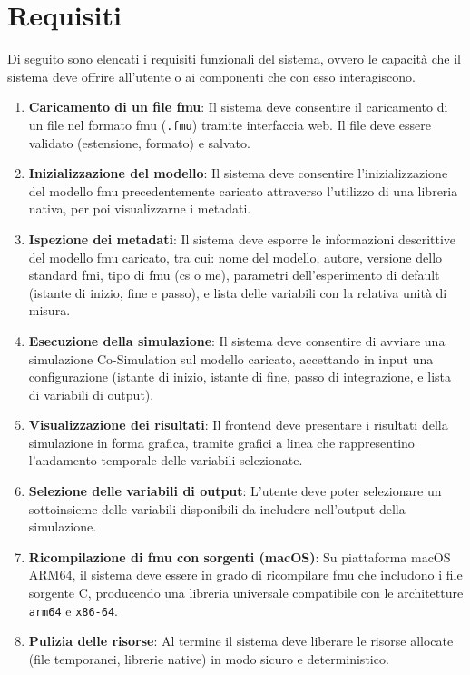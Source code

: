 \section{Requisiti}
\label{sec:analisi-requisiti}
Di seguito sono elencati i requisiti funzionali del sistema, ovvero le capacità che il sistema deve offrire all'utente o ai componenti che con esso interagiscono.
\begin{enumerate}
\item \textbf{Caricamento di un file \ac{fmu}}: Il sistema deve consentire il caricamento di un file nel formato \ac{fmu} (\texttt{.fmu}) tramite interfaccia web. Il file deve essere validato (estensione, formato) e salvato.
\item \textbf{Inizializzazione del modello}: Il sistema deve consentire l'inizializzazione del modello \ac{fmu} precedentemente caricato attraverso l'utilizzo di una libreria nativa, per poi visualizzarne i metadati.
\item \textbf{Ispezione dei metadati}: Il sistema deve esporre le informazioni descrittive del modello \ac{fmu} caricato, tra cui: nome del modello, autore, versione dello standard \ac{fmi}, tipo di \ac{fmu} (\ac{cs} o \ac{me}), parametri dell'esperimento di default (istante di inizio, fine e passo), e lista delle variabili con la relativa unità di misura.
\item \textbf{Esecuzione della simulazione}: Il sistema deve consentire di avviare una simulazione Co-Simulation sul modello caricato, accettando in input una configurazione (istante di inizio, istante di fine, passo di integrazione, e lista di variabili di output).
\item \textbf{Visualizzazione dei risultati}: Il frontend deve presentare i risultati della simulazione in forma grafica, tramite grafici a linea che rappresentino\\ l'andamento temporale delle variabili selezionate.
\item \textbf{Selezione delle variabili di output}: L'utente deve poter selezionare un sottoinsieme delle variabili disponibili da includere nell'output della simulazione.
\item \textbf{Ricompilazione di \ac{fmu} con sorgenti (macOS)}: Su piattaforma macOS ARM64, il sistema deve essere in grado di ricompilare \ac{fmu} che includono i file sorgente C, producendo una libreria universale compatibile con le architetture \texttt{arm64} e \texttt{x86-64}.
\item \textbf{Pulizia delle risorse}: Al termine il sistema deve liberare le risorse allocate (file temporanei, librerie native) in modo sicuro e deterministico.
\end{enumerate}

